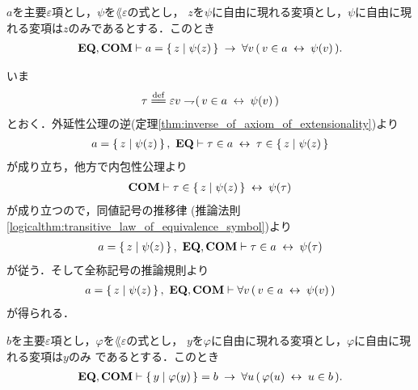 	\begin{screen}
		\begin{thm}
		\label{thm:equivalent_formula_rewriting_1}
			$a$を主要$\varepsilon$項とし，$\psi$を$\lang{\varepsilon}$の式とし，
			$z$を$\psi$に自由に現れる変項とし，$\psi$に自由に現れる変項は$z$のみであるとする．このとき
			\begin{align}
				\mbox{{\bf EQ}},\mbox{\bf COM} \vdash a = \left\{\, z \mid \psi(z)\, \right\} 
				\hspace{0.25em}\rightarrow\hspace{0.25em} \forall v\, (\, v \in a \hspace{0.25em}\leftrightarrow\hspace{0.25em} \psi(v)\, ).
			\end{align}
		\end{thm}
	\end{screen}
	
	\begin{sketch}
		いま
		\begin{align}
			\tau \defeq \varepsilon v \negation (\, v \in a \lrarrow \psi(v)\, )
		\end{align}
		とおく．外延性公理の逆(定理\ref{thm:inverse_of_axiom_of_extensionality})より
		\begin{align}
			a = \left\{\, z \mid \psi(z)\, \right\},\ \mbox{{\bf EQ}} \vdash 
			\tau \in a \hspace{0.25em}\leftrightarrow\hspace{0.25em} \tau \in \left\{\, z \mid \psi(z)\, \right\}
		\end{align}
		が成り立ち，他方で内包性公理より
		\begin{align}
			\mbox{\bf COM} \vdash \tau \in \left\{\, z \mid \psi(z)\, \right\} \hspace{0.25em}\leftrightarrow\hspace{0.25em} \psi(\tau)
		\end{align}
		が成り立つので，同値記号の推移律
		(推論法則\ref{logicalthm:transitive_law_of_equivalence_symbol})より
		\begin{align}
			a = \left\{\, z \mid \psi(z)\, \right\},\ \mbox{{\bf EQ}},\mbox{\bf COM} \vdash \tau \in a \hspace{0.25em}\leftrightarrow\hspace{0.25em} \psi(\tau)
		\end{align}
		が従う．そして全称記号の推論規則より
		\begin{align}
			a = \left\{\, z \mid \psi(z)\, \right\},\ \mbox{{\bf EQ}},\mbox{\bf COM} \vdash 
			\forall v\, (\, v \in a \hspace{0.25em}\leftrightarrow\hspace{0.25em} \psi(v)\, )
		\end{align}
		が得られる．
		\QED
	\end{sketch}
	
	\begin{screen}
		\begin{thm}
		\label{thm:equivalent_formula_rewriting_3}
			$b$を主要$\varepsilon$項とし，$\varphi$を$\lang{\varepsilon}$の式とし，
			$y$を$\varphi$に自由に現れる変項とし，$\varphi$に自由に現れる変項は$y$のみ
			であるとする．このとき
			\begin{align}
				\mbox{{\bf EQ}},\mbox{\bf COM} \vdash \left\{\, y \mid \varphi(y)\, \right\} = b 
				\hspace{0.25em}\rightarrow\hspace{0.25em} \forall u\, (\, \varphi(u) \hspace{0.25em}\leftrightarrow\hspace{0.25em} u \in b\, ).
			\end{align}
		\end{thm}
	\end{screen}
	
